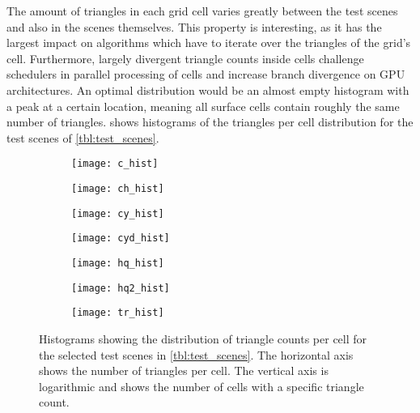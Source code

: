 The amount of triangles in each grid cell varies greatly between the test scenes and also in the scenes themselves.
This property is interesting, as it has the largest impact on algorithms which have to iterate over the triangles of the grid's cell.
Furthermore, largely divergent triangle counts inside cells challenge schedulers in parallel processing of cells and increase branch divergence on GPU architectures.
An optimal distribution would be an almost empty histogram with a peak at a certain location, meaning all surface cells contain roughly the same number of triangles.
 shows histograms of the triangles per cell distribution for the test scenes of \cref{tbl:test_scenes}.
%
\begin{figure}[!]
	\centering
	\begin{subfigure}[b]{0.49\textwidth}
		\centering
		\texttt{[image: c\_hist]}
		\caption{\cubes}
		\label{fig:cube2_histogram}
	\end{subfigure}
	\begin{subfigure}[b]{0.49\textwidth}
		\centering
		\texttt{[image: ch\_hist]}
		\caption{\cylinderhead}
		\label{fig:cylinder_head_histogram}
	\end{subfigure}
	\begin{subfigure}[b]{0.49\textwidth}
		\centering
		\texttt{[image: cy\_hist]}
		\caption{\cylinders}
		\label{fig:cylinders_histogram}
	\end{subfigure}
	\begin{subfigure}[b]{0.49\textwidth}
		\centering
		\texttt{[image: cyd\_hist]}
		\caption{\cylindersd}
		\label{fig:cylinders_d_histogram}
	\end{subfigure}
	\begin{subfigure}[b]{0.49\textwidth}
		\centering
		\texttt{[image: hq\_hist]}
		\caption{\impeller}
		\label{fig:impeller_histogram}
	\end{subfigure}
	\begin{subfigure}[b]{0.49\textwidth}
		\centering
		\texttt{[image: hq2\_hist]}
		\caption{\impellerhalf}
		\label{fig:impeller_2_histogram}
	\end{subfigure}
	\begin{subfigure}[b]{0.49\textwidth}
		\centering
		\texttt{[image: tr\_hist]}
		\caption{\turbine}
		\label{fig:turbine_histogram}
	\end{subfigure}
	\caption{
		Histograms showing the distribution of triangle counts per cell for the selected test scenes in \cref{tbl:test_scenes}.
		The horizontal axis shows the number of triangles per cell.
		The vertical axis is logarithmic and shows the number of cells with a specific triangle count.
	}
	\label{fig:histograms}
\end{figure}


